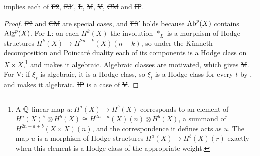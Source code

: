\begin{lemma}\label{lem:hcimplies}
\HC{} implies each of \st{F2}, \st{F3$'$}, \st{L}, \st{M}, \st{V}, \st{CM}
and \st{IP}.
\end{lemma}

\begin{proof}
\st{F2} and \st{CM} are special cases, and \st{F3$'$} holds because
$\operatorname{Ab}^{p}(X)$ contains $\operatorname{Alg}^{p}(X)$. For \st{L}: on each $H^{k}(X)$ the involution $*_{L}$ is
a morphism of Hodge structures $H^{k}(X)\to H^{2n-k}(X)(n-k)$, so under the
K\"unneth decomposition and Poincar\'e duality each of its components is a
Hodge class on $X\times X$,\footnote{A $\mathbb{Q}$-linear map $u\colon H^{a}(X)\to H^{b}(X)$
corresponds to an element of $H^{a}(X)^{\vee}\otimes H^{b}(X)\cong
H^{2n-a}(X)(n)\otimes H^{b}(X)$, a summand of $H^{2n-a+b}(X\times X)(n)$,
and the correspondence it defines acts as $u$. The map $u$ is a morphism of
Hodge structures $H^{a}(X)\to H^{b}(X)(r)$ exactly when this element is a
Hodge class of the appropriate weight.} and \HC{} makes it algebraic.
Algebraic classes are motivated, which gives \st{M}. For \st{V}: if $\xi_{s}$
is algebraic, it is a Hodge class, so $\xi_{t}$ is a Hodge class for every
$t$ by , and \HC{} makes it algebraic. \st{IP} is a case of
\st{V}.
\end{proof}
